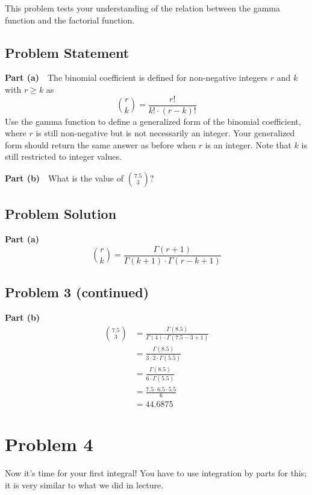 \documentclass[12pt]{article}
\theoremstyle{definition}
\begin{document}
This problem tests your understanding of the relation between the gamma function and the factorial function.

\subsection*{Problem Statement}

{\bf Part (a)}\ \ The binomial coefficient is defined for non-negative integers $r$ and $k$ with $r \geq k$ as
$$
{r \choose k} = \frac{r!}{k! \cdot (r - k)!}
$$
Use the gamma function to define a generalized form of the binomial coefficient, where $r$ is still non-negative but is not necessarily an integer. Your generalized form should return the same answer as before when $r$ is an integer. Note that $k$ is still restricted to integer values.

\bigskip
\noindent
{\bf Part (b)}\ \ What is the value of
$
\displaystyle { 7.5 \choose 3}
$?

\subsection*{Problem Solution}

\noindent
{\bf Part (a)}
\begin{equation}
{r \choose k} = \frac{\Gamma(r + 1)}{\Gamma(k + 1) \cdot \Gamma(r - k + 1)}
\end{equation}

\newpage
\subsection*{Problem 3 (continued)}


\vspace{0.5in}
\noindent
{\bf Part (b)}
\begin{align*}
{7.5 \choose 3} &= \frac{\Gamma(8.5)}{\Gamma(4) \cdot \Gamma(7.5 - 3 + 1)}\\
&= \frac{\Gamma(8.5)}{3 \cdot 2 \cdot \Gamma(5.5)}\\
&= \frac{\Gamma(8.5)}{6 \cdot \Gamma(5.5)}\\
&= \frac{7.5 \cdot 6.5 \cdot 5.5}{6}\\
&= 44.6875
\end{align*}

\newpage
\section*{Problem 4}

Now it's time for your first integral! You have to use integration by parts for this; it is very similar to what we did in lecture.
\end{document}
